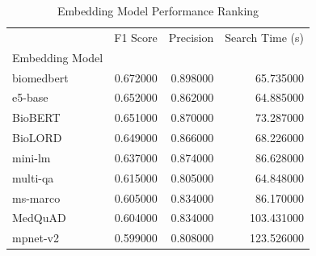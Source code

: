 \begin{table}[H]
\caption{Embedding Model Performance Ranking}
\label{tab:embedding_ranking}
\begin{tabular}{lrrr}
\toprule
 & F1 Score & Precision & Search Time (s) \\
Embedding Model &  &  &  \\
\midrule
biomedbert & 0.672000 & 0.898000 & 65.735000 \\
e5-base & 0.652000 & 0.862000 & 64.885000 \\
BioBERT & 0.651000 & 0.870000 & 73.287000 \\
BioLORD & 0.649000 & 0.866000 & 68.226000 \\
mini-lm & 0.637000 & 0.874000 & 86.628000 \\
multi-qa & 0.615000 & 0.805000 & 64.848000 \\
ms-marco & 0.605000 & 0.834000 & 86.170000 \\
MedQuAD & 0.604000 & 0.834000 & 103.431000 \\
mpnet-v2 & 0.599000 & 0.808000 & 123.526000 \\
\bottomrule
\end{tabular}
\end{table}
